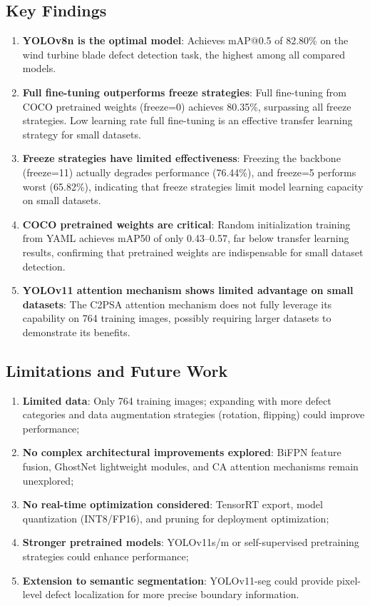 \documentclass[12pt,a4paper]{article}
\begin{document}
\subsection{Key Findings}

\begin{enumerate}[noitemsep]
  \item \textbf{YOLOv8n is the optimal model}: Achieves mAP@0.5 of 82.80\% on the wind turbine blade defect detection task, the highest among all compared models.

  \item \textbf{Full fine-tuning outperforms freeze strategies}: Full fine-tuning from COCO pretrained weights (freeze=0) achieves 80.35\%, surpassing all freeze strategies. Low learning rate full fine-tuning is an effective transfer learning strategy for small datasets.

  \item \textbf{Freeze strategies have limited effectiveness}: Freezing the backbone (freeze=11) actually degrades performance (76.44\%), and freeze=5 performs worst (65.82\%), indicating that freeze strategies limit model learning capacity on small datasets.

  \item \textbf{COCO pretrained weights are critical}: Random initialization training from YAML achieves mAP50 of only 0.43--0.57, far below transfer learning results, confirming that pretrained weights are indispensable for small dataset detection.

  \item \textbf{YOLOv11 attention mechanism shows limited advantage on small datasets}: The C2PSA attention mechanism does not fully leverage its capability on 764 training images, possibly requiring larger datasets to demonstrate its benefits.
\end{enumerate}

\subsection{Limitations and Future Work}

\begin{enumerate}[noitemsep]
  \item \textbf{Limited data}: Only 764 training images; expanding with more defect categories and data augmentation strategies (rotation, flipping) could improve performance;
  \item \textbf{No complex architectural improvements explored}: BiFPN feature fusion, GhostNet lightweight modules, and CA attention mechanisms remain unexplored;
  \item \textbf{No real-time optimization considered}: TensorRT export, model quantization (INT8/FP16), and pruning for deployment optimization;
  \item \textbf{Stronger pretrained models}: YOLOv11s/m or self-supervised pretraining strategies could enhance performance;
  \item \textbf{Extension to semantic segmentation}: YOLOv11-seg could provide pixel-level defect localization for more precise boundary information.
\end{enumerate}
\end{document}
